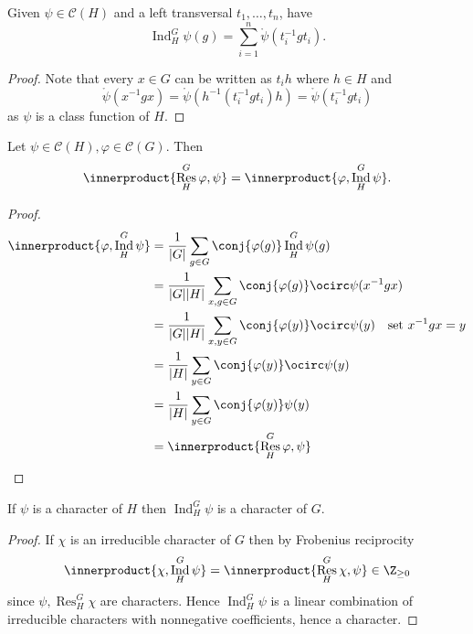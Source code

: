 \documentclass[a4paper]{article}
\newcommand*{\ip}{\innerproduct} %
\DeclareMathOperator{\Res}{Res} %
\DeclareMathOperator{\Ind}{Ind} %
\theoremstyle{definition}
\begin{document}
\begin{lemma}
  Given \(\psi \in \mathcal C(H)\) and a left transversal \(t_1, \dots, t_n\), have
  \[
    \Ind_H^G \psi(g) = \sum_{i = 1}^n \ocirc \psi(t_i^{-1} g t_i).
  \]
\end{lemma}

\begin{proof}
  Note that every \(x \in G\) can be written as \(t_i h\) where \(h \in H\) and
  \[
    \ocirc \psi(x^{-1} g x)
    = \ocirc \psi(h^{-1}(t_i^{-1} g t_i) h)
    = \ocirc \psi(t_i^{-1} gt_i)
  \]
  as \(\psi\) is a class function of \(H\).
\end{proof}

\begin{theorem}
  Let \(\psi \in \mathcal C(H), \varphi \in \mathcal C(G)\). Then
  \[
    \ip{\Res_H^G \varphi, \psi} = \ip{\varphi, \Ind_H^G \psi}.
  \]
\end{theorem}

\begin{proof}
  \begin{align*}
    \ip{\varphi, \Ind_H^G \psi}
    &= \frac{1}{|G|} \sum_{g \in G} \conj{\varphi(g)} \Ind_H^G \psi(g) \\
    &= \frac{1}{|G| |H|} \sum_{x, g \in G} \conj{\varphi(g)} \ocirc \psi(x^{-1}gx) \\
    &= \frac{1}{|G| |H|} \sum_{x, y \in G} \conj{\varphi(y)} \ocirc \psi(y) \quad \text{set } x^{-1}gx = y \\
    &= \frac{1}{|H|} \sum_{y \in G} \conj{\varphi(y)} \ocirc \psi(y) \\
    &= \frac{1}{|H|} \sum_{y \in G} \conj{\varphi(y)} \psi(y) \\
    &= \ip{\Res_H^G \varphi, \psi}
  \end{align*}
\end{proof}

\begin{corollary}
  If \(\psi\) is a character of \(H\) then \(\Ind_H^G \psi\) is a character of \(G\).
\end{corollary}

\begin{proof}
  If \(\chi\) is an irreducible character of \(G\) then by Frobenius reciprocity
  \[
    \ip{\chi, \Ind_H^G \psi} = \ip{\Res_H^G \chi, \psi} \in \Z_{\geq 0}
  \]
  since \(\psi, \Res_H^G \chi\) are characters. Hence \(\Ind_H^G \psi\) is a linear combination of irreducible characters with nonnegative coefficients, hence a character.
\end{proof}
\end{document}
